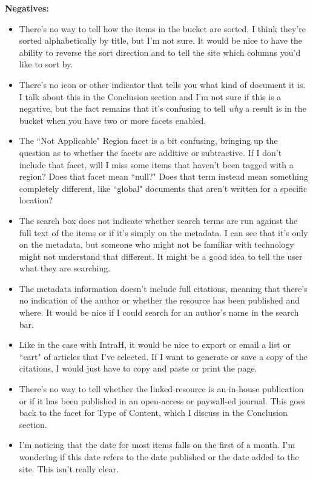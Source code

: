 \documentclass{article}
\begin{document}
\noindent\textbf{Negatives:}
\begin{itemize}
\itemsep0em 
    \item There's no way to tell how the items in the bucket are sorted. I think they're sorted alphabetically by title, but I'm not sure. It would be nice to have the ability to reverse the sort direction and to tell the site which columns you'd like to sort by.
    \item There's no icon or other indicator that tells you what kind of document it is. I talk about this in the Conclusion section and I'm not sure if this is a negative, but the fact remains that it's confusing to tell \textit{why} a result is in the bucket when you have two or more facets enabled. 
    \item The ``Not Applicable" Region facet is a bit confusing, bringing up the question as to whether the facets are additive or subtractive. If I don't include that facet, will I miss some items that haven't been tagged with a region? Does that facet mean ``null?" Does that term instead mean something completely different, like ``global" documents that aren't written for a specific location?
    \item The search box does not indicate whether search terms are run against the full text of the items or if it's simply on the metadata. I can see that it's only on the metadata, but someone who might not be familiar with technology might not understand that different. It might be a good idea to tell the user what they are searching.
    \item The metadata information doesn't include full citations, meaning that there's no indication of the author or whether the resource has been published and where. It would be nice if I could search for an author's name in the search bar.
    \item Like in the case with IntraH, it would be nice to export or email a list or ``cart" of articles that I've selected. If I want to generate or save a copy of the citations, I would just have to copy and paste or print the page. 
    \item There's no way to tell whether the linked resource is an in-house publication or if it has been published in an open-access or paywall-ed journal. This goes back to the facet for Type of Content, which I discuss in the Conclusion section.
    \item I'm noticing that the date for most items falls on the first of a month. I'm wondering if this date refers to the date published or the date added to the site. This isn't really clear.
\end{itemize}
\end{document}
